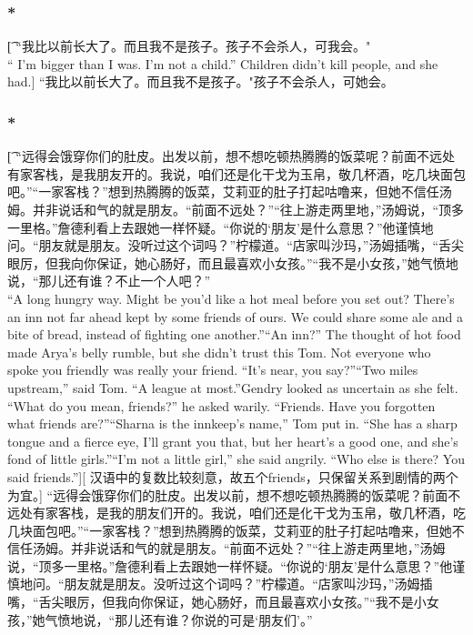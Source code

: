 \documentclass[12pt,a4paper]{article}
\begin{document}
\subsubsection{\color{red}*}\t[
	“我比以前长大了。而且我不是孩子。孩子不会杀人，可我会。"\\
	“ I'm bigger than I was. I'm not a child.” Children didn't kill people, and she had.]
	“我比以前长大了。而且我不是孩子。"孩子不会杀人，可她会。
	
\subsubsection{\color{red}*}\t[
	 “远得会饿穿你们的肚皮。出发以前，想不想吃顿热腾腾的饭菜呢？前面不远处有家客栈，是我朋友开的。我说，咱们还是化干戈为玉帛，敬几杯酒，吃几块面包吧。”“一家客栈？”想到热腾腾的饭菜，艾莉亚的肚子打起咕噜来，但她不信任汤姆。并非说话和气的就是朋友。“前面不远处？”“往上游走两里地，”汤姆说，“顶多一里格。”詹德利看上去跟她一样怀疑。“你说的‘朋友’是什么意思？”他谨慎地问。“朋友就是朋友。没听过这个词吗？”柠檬道。“店家叫沙玛，”汤姆插嘴，“舌尖眼厉，但我向你保证，她心肠好，而且最喜欢小女孩。”“我不是小女孩，”她气愤地说，“那儿还有谁？不止一个人吧？”\\
	 “A long hungry way. Might be you'd like a hot meal before you set out? There's an inn not far ahead kept by some friends of ours. We could share some ale and a bite of bread, instead of fighting one another.”“An inn?” The thought of hot food made Arya's belly rumble, but she didn't trust this Tom. Not everyone who spoke you friendly was really your friend. “It's near, you say?”“Two miles upstream,” said Tom. “A league at most.”Gendry looked as uncertain as she felt. “What do you mean, friends?” he asked warily. “Friends. Have you forgotten what friends are?”“Sharna is the innkeep's name,” Tom put in. “She has a sharp tongue and a fierce eye, I'll grant you that, but her heart's a good one, and she's fond of little girls.”“I'm not a little girl,” she said angrily. “Who else is there? You said friends.”][
	 汉语中的复数比较刻意，故五个friends，只保留关系到剧情的两个为宜。]
	 “远得会饿穿你们的肚皮。出发以前，想不想吃顿热腾腾的饭菜呢？前面不远处有家客栈，是我的朋友们开的。我说，咱们还是化干戈为玉帛，敬几杯酒，吃几块面包吧。”“一家客栈？”想到热腾腾的饭菜，艾莉亚的肚子打起咕噜来，但她不信任汤姆。并非说话和气的就是朋友。“前面不远处？”“往上游走两里地，”汤姆说，“顶多一里格。”詹德利看上去跟她一样怀疑。“你说的‘朋友’是什么意思？”他谨慎地问。“朋友就是朋友。没听过这个词吗？”柠檬道。“店家叫沙玛，”汤姆插嘴，“舌尖眼厉，但我向你保证，她心肠好，而且最喜欢小女孩。”“我不是小女孩，”她气愤地说，“那儿还有谁？你说的可是‘朋友们’。”
	 
\end{document}
